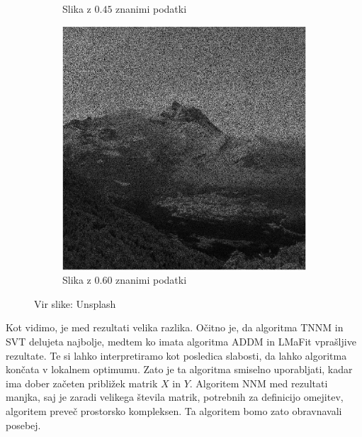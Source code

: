 \begin{figure}[h]
\begin{subfigure}{0.49\linewidth}
        \caption{Slika z $0.45$ znanimi podatki}
    \end{subfigure}
    \hfill
    \begin{subfigure}{0.49\linewidth}
        \includegraphics[width=\linewidth]{Poglavja/Slike/grayscale1000/slikaInput60.png}
        \caption{Slika z $0.60$ znanimi podatki}
    \end{subfigure}
    \caption{Vir slike: Unsplash}
\end{figure}

Kot vidimo, je med rezultati velika razlika. Očitno je, da algoritma TNNM in SVT delujeta najbolje, medtem ko imata algoritma ADDM in LMaFit vprašljive rezultate. Te si lahko interpretiramo kot posledica slabosti, da lahko algoritma končata v lokalnem optimumu. Zato je ta algoritma smiselno uporabljati, kadar ima dober začeten približek matrik $X$ in $Y$. Algoritem NNM med rezultati manjka, saj je zaradi velikega števila matrik, potrebnih za definicijo omejitev, algoritem preveč prostorsko kompleksen. Ta algoritem bomo zato obravnavali posebej.